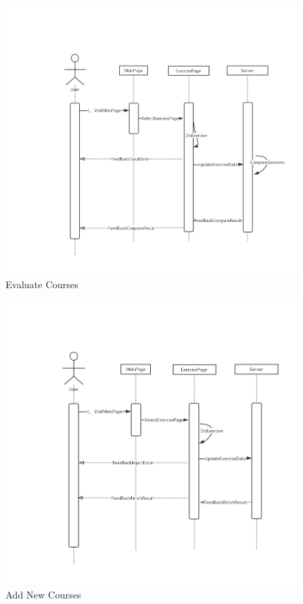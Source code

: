 \documentclass[16pt]{scrreprt}
\begin{document}
\begin{figure}[H]
    \includegraphics[width=\linewidth]{./FuncPhoto/17.png}   
    \caption{Evaluate Courses}
\end{figure}

\begin{figure}[H]
    \includegraphics[width=\linewidth]{./FuncPhoto/18.png}   
    \caption{Add New Courses}
\end{figure}
\end{document}
